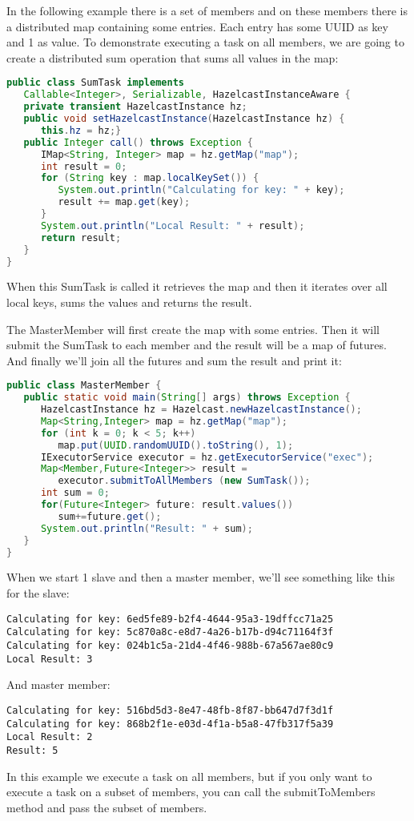 In the following example there is a set of members and on these members there is a distributed map containing some entries. Each entry has some UUID as key and 1 as value. To demonstrate executing a task on all members, we are going to create a distributed sum operation that sums all values in the map:
\begin{lstlisting}[language=java]
public class SumTask implements
   Callable<Integer>, Serializable, HazelcastInstanceAware {
   private transient HazelcastInstance hz;
   public void setHazelcastInstance(HazelcastInstance hz) {
      this.hz = hz;}
   public Integer call() throws Exception {
      IMap<String, Integer> map = hz.getMap("map");
      int result = 0;
      for (String key : map.localKeySet()) {
         System.out.println("Calculating for key: " + key);
         result += map.get(key);
      }
      System.out.println("Local Result: " + result);
      return result;
   }
}
\end{lstlisting}
When this SumTask is called it retrieves the map and then it iterates over all local keys, sums the values and returns the result.

The MasterMember will first create the map with some entries. Then it will submit the SumTask to each member and the result will be a map of futures. And finally we'll join all the futures and sum the result and print it:
\begin{lstlisting}[language=java]
public class MasterMember {
   public static void main(String[] args) throws Exception {
      HazelcastInstance hz = Hazelcast.newHazelcastInstance();
      Map<String,Integer> map = hz.getMap("map");
      for (int k = 0; k < 5; k++)
         map.put(UUID.randomUUID().toString(), 1);
      IExecutorService executor = hz.getExecutorService("exec");
      Map<Member,Future<Integer>> result = 
         executor.submitToAllMembers (new SumTask());
      int sum = 0;
      for(Future<Integer> future: result.values())
         sum+=future.get();
      System.out.println("Result: " + sum);
   }
}
\end{lstlisting}
When we start 1 slave and then a master member, we'll see something like this for the slave:
\begin{lstlisting}
Calculating for key: 6ed5fe89-b2f4-4644-95a3-19dffcc71a25
Calculating for key: 5c870a8c-e8d7-4a26-b17b-d94c71164f3f
Calculating for key: 024b1c5a-21d4-4f46-988b-67a567ae80c9
Local Result: 3
\end{lstlisting}
And master member:
\begin{lstlisting}
Calculating for key: 516bd5d3-8e47-48fb-8f87-bb647d7f3d1f
Calculating for key: 868b2f1e-e03d-4f1a-b5a8-47fb317f5a39
Local Result: 2
Result: 5
\end{lstlisting}
In this example we execute a task on all members, but if you only want to execute a task on a subset of members, you can call the submitToMembers method and pass the subset of members.

